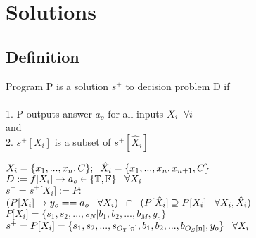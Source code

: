 \documentclass[11pt]{article}
\begin{document}
\section{Solutions}

\subsection{Definition}
Program P is a solution $s^{+}$ to decision problem D if \\\\
1. P outputs answer $a_o$ for all inputs $X_i \hspace{2mm} \forall i$\\
and \\
2. $s^{+}[X_i]$ is a subset of $s^{+}[\hat{X}_i]$
\begin{center}
\vspace{2mm}
$
X_i = \{x_1,...,x_n,C\}; \hspace{2mm} \hat{X}_i = \{x_1,...,x_n,x_{n+1},C\}
$
\\ \vspace{2mm}
$
D := f \lbrack X_i \rbrack \rightarrow a_{o} \in \{\mathbb{T}, \mathbb{F}\} \hspace{3mm} \forall X_i
$
\\ \vspace{2mm}
$
s^+ = s^+\lbrack X_i \rbrack := P :
$
\\ \vspace{2mm}
$
(P \lbrack X_i \rbrack \rightarrow y_{o} == a_{o} \hspace{3mm} \forall X_i) \hspace{2mm} \cap \hspace{2mm} (P[\hat{X}_i] \supseteq P[X_i] \hspace{3mm} \forall X_i,\hat{X}_i)
$
\\ \vspace{4mm}
$
P \lbrack X_i \rbrack = \{ s_1,s_2,...,s_N| b_1, b_2,...,b_M,y_o\}
$
\\ \vspace{3mm}
$
s^+ = P \lbrack X_i \rbrack = \{ s_1,s_2,...,s_{O_T \lbrack n \rbrack }, b_1, b_2,...,b_{O_S \lbrack n \rbrack},y_o \} \hspace{3mm} \forall X_i
$
\end{center}
\end{document}
